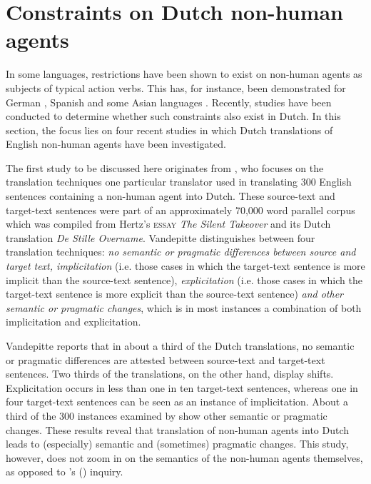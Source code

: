 \documentclass[output=paper]{LSP/langsci}
\begin{document}
\section{Constraints on Dutch non-human agents} \label{sec:5:3}
In some languages, restrictions have been shown to exist on non-human agents as subjects of typical action verbs. This has, for instance, been demonstrated for German \citep[see e.g.][]{Bahns1993}, Spanish \citep[see e.g.][]{Slabakova2002} and some Asian languages \citep[see e.g.][]{Master1991}. Recently, studies have been conducted to determine whether such constraints also exist in Dutch. In this section, the focus lies on four recent studies in which Dutch translations of English non-human agents have been investigated.

The first study to be discussed here originates from  \citet{Vandepitte2007}, who focuses on the translation techniques one particular translator used in translating 300 English sentences containing a non-human agent into Dutch. These source-text and target-text sentences were part of an approximately 70,000 word parallel corpus which was compiled from Hertz’s \textsc{essay} \textit{The Silent Takeover} and its Dutch translation \textit{De Stille Overname}. Vandepitte distinguishes between four translation techniques: \textit{no semantic or pragmatic differences between source and target text, implicitation} (i.e. those cases in which the target-text sentence is more implicit than the source-text sentence), \textit{explicitation} (i.e. those cases in which the target-text sentence is more explicit than the source-text sentence) \textit{and other semantic or pragmatic changes}, which is in most instances a combination of both implicitation and explicitation.

Vandepitte reports that in about a third of the Dutch translations, no semantic or pragmatic differences are attested between source-text and target-text sentences. Two thirds of the translations, on the other hand, display shifts. Explicitation occurs in less than one in ten target-text sentences, whereas one in four target-text sentences can be seen as an instance of implicitation. About a third of the 300 instances examined by \citet{Vandepitte2007} show other semantic or pragmatic changes. These results reveal that translation of non-human agents into Dutch leads to (especially) semantic and (sometimes) pragmatic changes. This study, however, does not zoom in on the semantics of the non-human agents themselves, as opposed to \citeauthor{Dhaeyere2010}'s (\citeyear{Dhaeyere2010}) inquiry. 
	
\end{document}
